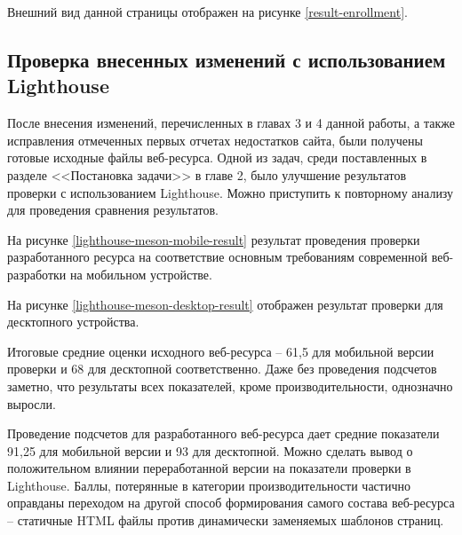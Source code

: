 Внешний вид данной страницы отображен на рисунке \ref{result-enrollment}.



\subsection{Проверка внесенных изменений с использованием Lighthouse}

После внесения изменений, перечисленных в главах 3 и 4 данной работы, а также исправления отмеченных первых отчетах недостатков сайта, были получены готовые исходные файлы веб-ресурса.
Одной из задач, среди поставленных в разделе <<Постановка задачи>> в главе 2, было улучшение результатов проверки с использованием Lighthouse.
Можно приступить к повторному анализу для проведения сравнения результатов.

На рисунке \ref{lighthouse-meson-mobile-result} результат проведения проверки разработанного ресурса на соответствие основным требованиям современной веб-разработки на мобильном устройстве.


На рисунке \ref{lighthouse-meson-desktop-result} отображен результат проверки для десктопного устройства.


Итоговые средние оценки исходного веб-ресурса -- 61,5 для мобильной версии проверки и 68 для десктопной соответственно.
Даже без проведения подсчетов заметно, что результаты всех показателей, кроме производительности, однозначно выросли.

Проведение подсчетов для разработанного веб-ресурса дает средние показатели 91,25 для мобильной версии и 93 для десктопной.
Можно сделать вывод о положительном влиянии переработанной версии на показатели проверки в Lighthouse.
Баллы, потерянные в категории производительности частично оправданы переходом на другой способ формирования самого состава веб-ресурса -- статичные HTML файлы против динамически заменяемых шаблонов страниц.

\clearpage
